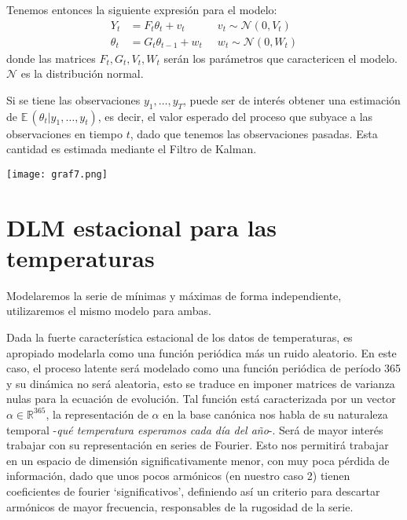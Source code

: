 \documentclass{article}
\newcommand{\RR}{\mathbb{R}}
\newcommand{\E}{\mathbb{E} \,}
\begin{document}
Tenemos entonces la siguiente expresión para el modelo:
\begin{equation}
\begin{aligned}
Y_t&=F_t\theta_t + v_t  \;&\;  v_t \sim \mathcal{N}(0,V_t) \\
\theta_t &= G_t \theta_{t-1} + w_t \;&\; w_t \sim \mathcal{N}(0,W_t)
\end{aligned}
\label{eq:modelo}
\end{equation} donde las matrices $F_t,G_t,V_t,W_t$ serán los parámetros que caractericen el modelo. $\mathcal{N}$ es la distribución normal.

Si se tiene las observaciones $y_1,\dots,y_T$, puede ser de interés obtener una estimación de $\E(\theta_t | y_1,\dots,y_t)$, es decir, el valor esperado del proceso que subyace a las observaciones en tiempo $t$, dado que tenemos las observaciones pasadas. Esta cantidad es estimada mediante el Filtro de Kalman.

\begin{center}
\texttt{[image: graf7.png]}
\vspace{-.75em}
\label{fig:graf7}
\end{center}

\section{DLM estacional para las temperaturas}

Modelaremos la serie de mínimas y máximas de forma independiente, utilizaremos el mismo modelo para ambas.

Dada la fuerte característica estacional de los datos de temperaturas, es apropiado modelarla como una función periódica más un ruido aleatorio. En este caso, el proceso latente será modelado como una función periódica de período 365 y su dinámica no será aleatoria, esto se traduce en imponer matrices de varianza nulas para la ecuación de evolución.
Tal función está caracterizada por un vector $\alpha \in \RR^{365}$, la representación de $\alpha$ en la base canónica nos habla de su naturaleza temporal -\textit{qué temperatura esperamos cada día del año}-. Será de mayor interés trabajar con su representación en series de Fourier. Esto nos permitirá trabajar en un espacio de dimensión significativamente menor, con muy poca pérdida de información, dado que unos pocos armónicos (en nuestro caso 2) tienen coeficientes de fourier `significativos', definiendo así un criterio para descartar armónicos de mayor frecuencia, responsables de la rugosidad de la serie.
\end{document}
